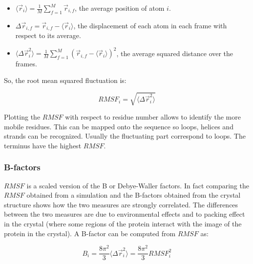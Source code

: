 	\begin{itemize}
		\item $\langle \vec{r}_i\rangle = \frac{1}{M}\sum\limits_{f=1}^M\vec{r}_{i,f}$, the average position of atom $i$.
		\item $\Delta\vec{r}_{i,f} = \vec{r}_{i,f}-\langle\vec{r}_i\rangle$, the displacement of each atom in each frame with respect to its average.
		\item $\langle \Delta\vec{r}_i^2\rangle = \frac{1}{M}\sum\limits_{f=1}^M(\vec{r}_{i,f}-\langle\vec{r}_i\rangle)^2$, the average squared distance over the frames.
	\end{itemize}

	So, the root mean squared fluctuation is:

	$$RMSF_i = \sqrt{\langle\Delta\vec{r}_i^2\rangle}$$

	Plotting the $RMSF$ with respect to residue number allows to identify the more mobile residues.
	This can be mapped onto the sequence so loops, helices and strands can be recognized.
	Usually the fluctuating part correspond to loops.
	The terminus have the highest $RMSF$.

		\subsubsection{B-factors}
		$RMSF$ is a scaled version of the B or Debye-Waller factors.
		In fact comparing the $RMSF$ obtained from a simulation and the B-factors obtained from the crystal structure shows how the two measures are strongly correlated.
		The differences between the two measures are due to environmental effects and to packing effect in the crystal (where some regions of the protein interact with the image of the protein in the crystal).
		A B-factor can be computed from $RMSF$ as:

		$$B_i = \frac{8\pi^2}{3}\langle\Delta\vec{r}_i^2\rangle = \frac{8\pi^2}{3}RMSF^2_i$$
